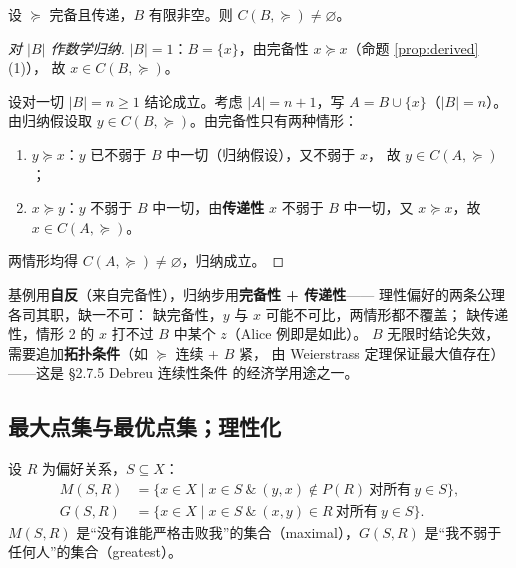 \begin{theorem}\label{thm:nonempty}
设 $\succeq$ 完备且传递，$B$ 有限非空。则 $C(B,\succeq)\neq\varnothing$。
\end{theorem}

\begin{proof}[对 $|B|$ 作数学归纳]
$|B|=1$：$B=\{x\}$，由完备性 $x\succeq x$（命题 \ref{prop:derived}(1)），
故 $x\in C(B,\succeq)$。

设对一切 $|B|=n\ge 1$ 结论成立。考虑 $|A|=n+1$，写 $A=B\cup\{x\}$（$|B|=n$）。
由归纳假设取 $y\in C(B,\succeq)$。由完备性只有两种情形：
\begin{enumerate}
  \item $y\succeq x$：$y$ 已不弱于 $B$ 中一切（归纳假设），又不弱于 $x$，
  故 $y\in C(A,\succeq)$；
  \item $x\succeq y$：$y$ 不弱于 $B$ 中一切，由\textbf{传递性} $x$ 不弱于
  $B$ 中一切，又 $x\succeq x$，故 $x\in C(A,\succeq)$。
\end{enumerate}
两情形均得 $C(A,\succeq)\neq\varnothing$，归纳成立。
\end{proof}

\begin{remark}[这个定理用足了什么]
基例用\textbf{自反}（来自完备性），归纳步用\textbf{完备性 + 传递性}——
理性偏好的两条公理各司其职，缺一不可：
缺完备性，$y$ 与 $x$ 可能不可比，两情形都不覆盖；
缺传递性，情形 2 的 $x$ 打不过 $B$ 中某个 $z$（Alice 例即是如此）。
$B$ 无限时结论失效，需要追加\textbf{拓扑条件}（如 $\succeq$ 连续 + $B$ 紧，
由 Weierstrass 定理保证最大值存在）——这是 §2.7.5 Debreu 连续性条件
的经济学用途之一。
\end{remark}

\subsection{最大点集与最优点集；理性化}

\begin{definition}
设 $R$ 为偏好关系，$S\subseteq X$：
\begin{align}
M(S,R) &= \{x\in X \mid x\in S \ \&\ (y,x)\notin P(R)\ \text{对所有}\ y\in S\},\\
G(S,R) &= \{x\in X \mid x\in S \ \&\ (x,y)\in R\ \text{对所有}\ y\in S\}.
\end{align}
$M(S,R)$ 是“没有谁能严格击败我”的集合（maximal），$G(S,R)$ 是“我不弱于任何人”的集合（greatest）。
\end{definition}

